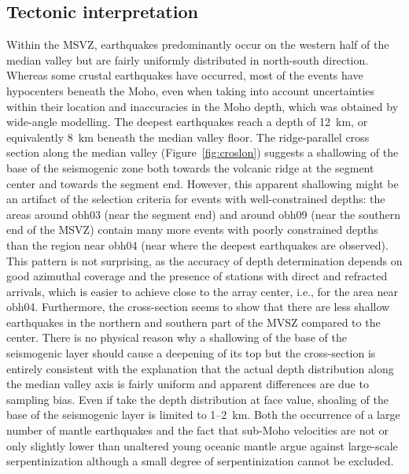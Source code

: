 \documentclass[jgr]{aguplus}
\begin{document}
\begin{article}
\subsection{Tectonic interpretation}

Within the MSVZ, earthquakes predominantly occur on the western half of the median valley but are
fairly uniformly distributed in north-south direction.  Whereas some
crustal earthquakes have occurred, most of the events have hypocenters
beneath the Moho, even when taking into account uncertainties within
their location and inaccuracies in the Moho depth, which was obtained
by wide-angle modelling.  The deepest earthquakes reach a depth of
12~km, or equivalently 8~km beneath the median valley floor. The ridge-parallel cross section
along the median valley (Figure~\ref{fig:croslon}) suggests a
shallowing of the base of the seismogenic zone both towards the
volcanic ridge at the segment center and towards the segment end.
However, this apparent shallowing might be an artifact of the
selection criteria for events with well-constrained depths: the areas
around obh03 (near the segment end) and around obh09 (near
the southern end of the MSVZ) contain many more
events with poorly constrained depths than the region
near obh04 (near where the deepest earthquakes are observed).  This
pattern is not surprising, as the accuracy of depth determination
depends on good azimuthal coverage and the presence of stations with
direct and refracted arrivals, which is easier to achieve close to the
array center, i.e., for the area near obh04.  Furthermore, the cross-section seems to show that there are less
shallow earthquakes in the northern  and
southern part of the MVSZ compared to the center.  There is no physical reason why a shallowing of
the base of the seismogenic layer should cause a deepening of
its top but the cross-section is entirely consistent with
the explanation that the actual depth distribution along the median
valley axis is fairly uniform and apparent differences are due to
sampling bias. Even if take the depth distribution at face value,
shoaling of the base of the seismogenic layer is limited to 1--2~km.
Both the occurrence of a large number of mantle earthquakes and the
fact that sub-Moho velocities are not or only slightly lower than
unaltered young oceanic mantle argue against large-scale
serpentinization although a small degree of serpentinization cannot be
excluded.


\end{article}
\end{document}
